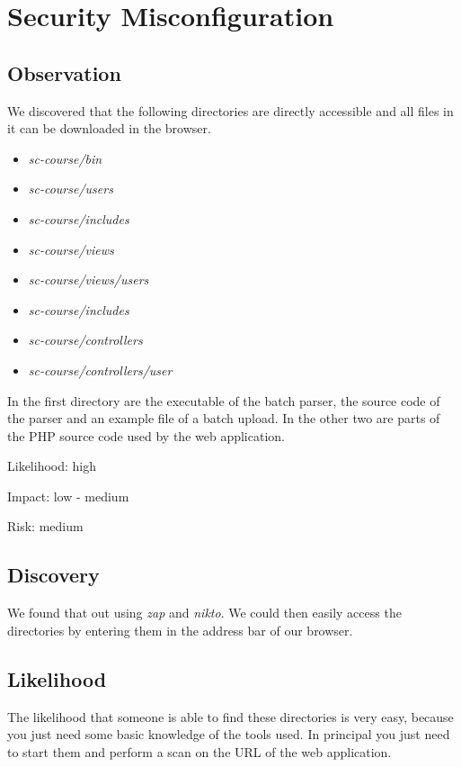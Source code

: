 \chapter{Security Misconfiguration}

\section{Observation}

We discovered that the following directories are directly accessible and all files in it can be downloaded in the browser.

\begin{itemize}
\item \textit{sc-course/bin}
\item \textit{sc-course/users}
\item \textit{sc-course/includes}
\item \textit{sc-course/views}
\item \textit{sc-course/views/users}
\item \textit{sc-course/includes}
\item \textit{sc-course/controllers}
\item \textit{sc-course/controllers/user}
\end{itemize}

In the first directory are the executable of the batch parser, the source code of the parser and an example file of a batch upload. In the other two are parts of the PHP source code used by the web application.\newline


Likelihood: high \newline

Impact: low - medium\newline

Risk: medium\newline

\section{Discovery}

We found that out using \textit{zap} and \textit{nikto}. We could then easily access the directories by entering them in the address bar of our browser.

\section{Likelihood}
The likelihood that someone is able to find these directories is very easy, because you just need some basic knowledge of the tools used. In principal you just need to start them and perform a scan on the URL of the web application.

